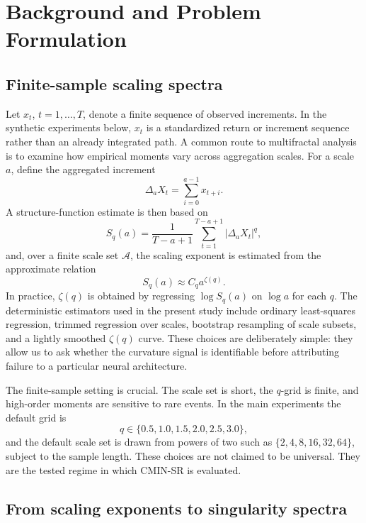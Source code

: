 \section{Background and Problem Formulation}

\subsection{Finite-sample scaling spectra}

Let \(x_t\), \(t=1,\ldots,T\), denote a finite sequence of observed
increments. In the synthetic experiments below, \(x_t\) is a standardized
return or increment sequence rather than an already integrated path. A common
route to multifractal analysis is to examine how empirical moments vary across
aggregation scales. For a scale \(a\), define the aggregated increment
\begin{equation}
  \Delta_a X_t=\sum_{i=0}^{a-1}x_{t+i}.
\end{equation}
A structure-function estimate is then based on
\begin{equation}
  S_q(a)=\frac{1}{T-a+1}\sum_{t=1}^{T-a+1}
  |\Delta_a X_t|^q ,
  \label{eq:structure-function}
\end{equation}
and, over a finite scale set \(\mathcal A\), the scaling exponent is estimated
from the approximate relation
\begin{equation}
  S_q(a)\approx C_q a^{\zeta(q)}.
  \label{eq:scaling-law}
\end{equation}
In practice, \(\zeta(q)\) is obtained by regressing \(\log S_q(a)\) on
\(\log a\) for each \(q\). The deterministic estimators used in the present
study include ordinary least-squares regression, trimmed regression over
scales, bootstrap resampling of scale subsets, and a lightly smoothed
\(\zeta(q)\) curve. These choices are deliberately simple: they allow us to
ask whether the curvature signal is identifiable before attributing failure to
a particular neural architecture.

The finite-sample setting is crucial. The scale set is short, the \(q\)-grid is
finite, and high-order moments are sensitive to rare events. In the main
experiments the default grid is
\[
q\in\{0.5,1.0,1.5,2.0,2.5,3.0\},
\]
and the default scale set is drawn from powers of two such as
\(\{2,4,8,16,32,64\}\), subject to the sample length. These choices are not
claimed to be universal. They are the tested regime in which CMIN-SR is
evaluated.

\subsection{From scaling exponents to singularity spectra}

